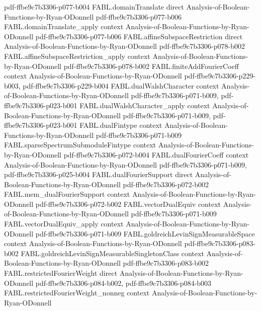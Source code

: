 \begin{theorem}
  {pdf-ffbe9c7b3306-p077-b004}
\proofstep
  {FABL.domainTranslate}
  {direct}
  {Analysis-of-Boolean-Functions-by-Ryan-ODonnell}
  {pdf-ffbe9c7b3306-p077-b006}
\proofstep
  {FABL.domainTranslate_apply}
  {context}
  {Analysis-of-Boolean-Functions-by-Ryan-ODonnell}
  {pdf-ffbe9c7b3306-p077-b006}
\proofstep
  {FABL.affineSubspaceRestriction}
  {direct}
  {Analysis-of-Boolean-Functions-by-Ryan-ODonnell}
  {pdf-ffbe9c7b3306-p078-b002}
\proofstep
  {FABL.affineSubspaceRestriction_apply}
  {context}
  {Analysis-of-Boolean-Functions-by-Ryan-ODonnell}
  {pdf-ffbe9c7b3306-p078-b002}
\proofstep
  {FABL.finiteAddFourierCoeff}
  {context}
  {Analysis-of-Boolean-Functions-by-Ryan-ODonnell}
  {pdf-ffbe9c7b3306-p229-b003,
    pdf-ffbe9c7b3306-p229-b004}
\proofstep
  {FABL.dualWalshCharacter}
  {context}
  {Analysis-of-Boolean-Functions-by-Ryan-ODonnell}
  {pdf-ffbe9c7b3306-p071-b009,
    pdf-ffbe9c7b3306-p023-b001}
\proofstep
  {FABL.dualWalshCharacter_apply}
  {context}
  {Analysis-of-Boolean-Functions-by-Ryan-ODonnell}
  {pdf-ffbe9c7b3306-p071-b009,
    pdf-ffbe9c7b3306-p023-b001}
\proofstep
  {FABL.dualFintype}
  {context}
  {Analysis-of-Boolean-Functions-by-Ryan-ODonnell}
  {pdf-ffbe9c7b3306-p071-b009}
\proofstep
  {FABL.sparseSpectrumSubmoduleFintype}
  {context}
  {Analysis-of-Boolean-Functions-by-Ryan-ODonnell}
  {pdf-ffbe9c7b3306-p072-b004}
\proofstep
  {FABL.dualFourierCoeff}
  {context}
  {Analysis-of-Boolean-Functions-by-Ryan-ODonnell}
  {pdf-ffbe9c7b3306-p071-b009,
    pdf-ffbe9c7b3306-p025-b004}
\proofstep
  {FABL.dualFourierSupport}
  {direct}
  {Analysis-of-Boolean-Functions-by-Ryan-ODonnell}
  {pdf-ffbe9c7b3306-p072-b002}
\proofstep
  {FABL.mem_dualFourierSupport}
  {context}
  {Analysis-of-Boolean-Functions-by-Ryan-ODonnell}
  {pdf-ffbe9c7b3306-p072-b002}
\proofstep
  {FABL.vectorDualEquiv}
  {context}
  {Analysis-of-Boolean-Functions-by-Ryan-ODonnell}
  {pdf-ffbe9c7b3306-p071-b009}
\proofstep
  {FABL.vectorDualEquiv_apply}
  {context}
  {Analysis-of-Boolean-Functions-by-Ryan-ODonnell}
  {pdf-ffbe9c7b3306-p071-b009}
\proofstep
  {FABL.goldreichLevinSignMeasurableSpace}
  {context}
  {Analysis-of-Boolean-Functions-by-Ryan-ODonnell}
  {pdf-ffbe9c7b3306-p083-b002}
\proofstep
  {FABL.goldreichLevinSignMeasurableSingletonClass}
  {context}
  {Analysis-of-Boolean-Functions-by-Ryan-ODonnell}
  {pdf-ffbe9c7b3306-p083-b002}
\proofstep
  {FABL.restrictedFourierWeight}
  {direct}
  {Analysis-of-Boolean-Functions-by-Ryan-ODonnell}
  {pdf-ffbe9c7b3306-p084-b002,
    pdf-ffbe9c7b3306-p084-b003}
\proofstep
  {FABL.restrictedFourierWeight_nonneg}
  {context}
  {Analysis-of-Boolean-Functions-by-Ryan-ODonnell}

\end{theorem}
